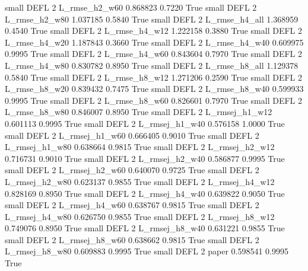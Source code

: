      small     DEFL                 2  L_rmse_h2_w60   0.868823      0.7220    True
     small     DEFL                 2  L_rmse_h2_w80   1.037185      0.5840    True
     small     DEFL                 2  L_rmse_h4_all   1.368959      0.4540    True
     small     DEFL                 2  L_rmse_h4_w12   1.222158      0.3880    True
     small     DEFL                 2  L_rmse_h4_w20   1.187843      0.3660    True
     small     DEFL                 2  L_rmse_h4_w40   0.609975      0.9995    True
     small     DEFL                 2  L_rmse_h4_w60   0.843604      0.7970    True
     small     DEFL                 2  L_rmse_h4_w80   0.830782      0.8950    True
     small     DEFL                 2  L_rmse_h8_all   1.129378      0.5840    True
     small     DEFL                 2  L_rmse_h8_w12   1.271206      0.2590    True
     small     DEFL                 2  L_rmse_h8_w20   0.839432      0.7475    True
     small     DEFL                 2  L_rmse_h8_w40   0.599933      0.9995    True
     small     DEFL                 2  L_rmse_h8_w60   0.826601      0.7970    True
     small     DEFL                 2  L_rmse_h8_w80   0.846007      0.8950    True
     small     DEFL                 2 L_rmsej_h1_w12   0.601113      0.9995    True
     small     DEFL                 2 L_rmsej_h1_w40   0.576158      1.0000    True
     small     DEFL                 2 L_rmsej_h1_w60   0.666405      0.9010    True
     small     DEFL                 2 L_rmsej_h1_w80   0.638664      0.9815    True
     small     DEFL                 2 L_rmsej_h2_w12   0.716731      0.9010    True
     small     DEFL                 2 L_rmsej_h2_w40   0.586877      0.9995    True
     small     DEFL                 2 L_rmsej_h2_w60   0.640070      0.9725    True
     small     DEFL                 2 L_rmsej_h2_w80   0.623137      0.9855    True
     small     DEFL                 2 L_rmsej_h4_w12   0.828169      0.8950    True
     small     DEFL                 2 L_rmsej_h4_w40   0.639822      0.9050    True
     small     DEFL                 2 L_rmsej_h4_w60   0.638767      0.9815    True
     small     DEFL                 2 L_rmsej_h4_w80   0.626750      0.9855    True
     small     DEFL                 2 L_rmsej_h8_w12   0.749076      0.8950    True
     small     DEFL                 2 L_rmsej_h8_w40   0.631221      0.9855    True
     small     DEFL                 2 L_rmsej_h8_w60   0.638662      0.9815    True
     small     DEFL                 2 L_rmsej_h8_w80   0.609883      0.9995    True
     small     DEFL                 2          paper   0.598541      0.9995    True
